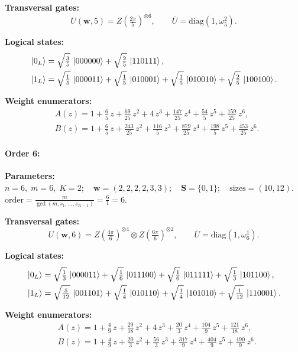 \documentclass[pdflatex,sn-nature]{sn-jnl}%
\theoremstyle{thmstyleone}%
\theoremstyle{thmstyletwo}%
\theoremstyle{thmstylethree}%
\begin{document}
\begin{appendices}
\noindent\textbf{Transversal gates:}
\[
    U(\mathbf w,5)=Z \left(\tfrac{2\pi}{5}\right)^{\otimes6} ,\qquad
    \overline U=\mathrm{diag}(1,\omega_{5}^{2}).
\]

\noindent\textbf{Logical states:}
\begin{align*}
    &\ket{0_L} = \sqrt{\tfrac{3}{5}}\,\ket{000000} + \sqrt{\tfrac{2}{5}}\,\ket{110111}, \\
    &\ket{1_L} = \sqrt{\tfrac{1}{5}}\,\ket{000011} + \sqrt{\tfrac{1}{5}}\,\ket{010001} + \sqrt{\tfrac{1}{5}}\,\ket{010010} + \sqrt{\tfrac{2}{5}}\,\ket{100100}.
\end{align*}

\noindent\textbf{Weight enumerators:}
\begin{align*}
    &A(z) = 1 + \tfrac{6}{5}\,z + \tfrac{69}{25}\,z^{2} + 4\,z^{3} + \tfrac{147}{25}\,z^{4} + \tfrac{54}{5}\,z^{5} + \tfrac{159}{25}\,z^{6}, \\
    &B(z) = 1 + \tfrac{6}{5}\,z + \tfrac{243}{25}\,z^{2} + \tfrac{116}{5}\,z^{3} + \tfrac{879}{25}\,z^{4} + \tfrac{198}{5}\,z^{5} + \tfrac{453}{25}\,z^{6}.
\end{align*}

\paragraph{\textbf{Order 6:}}
\noindent\textbf{Parameters:} $n=6,\; m=6,\; K=2;\quad \mathbf w=(2, 2, 2, 2, 3, 3);\quad \mathbf S=\{0, 1\};\quad \text{sizes}=\left(10, 12\right).$ $\displaystyle \text{order}=\frac{m}{\gcd(m,s_1,\dots,s_{K-1})}=\frac{6}{1}=6.$

\noindent\textbf{Transversal gates:}
\[
    U(\mathbf w,6)=Z \left(\tfrac{4\pi}{6}\right)^{\otimes4} \otimes Z \left(\tfrac{6\pi}{6}\right)^{\otimes2} ,\qquad
    \overline U=\mathrm{diag}(1,\omega_{6}^{1}).
\]

\noindent\textbf{Logical states:}
\begin{align*}
    &\ket{0_L} = \sqrt{\tfrac{1}{3}}\,\ket{000011} + \sqrt{\tfrac{1}{6}}\,\ket{011100} + \sqrt{\tfrac{1}{6}}\,\ket{011111} + \sqrt{\tfrac{1}{3}}\,\ket{101100}, \\
    &\ket{1_L} = \sqrt{\tfrac{5}{12}}\,\ket{001101} + \sqrt{\tfrac{1}{4}}\,\ket{010110} + \sqrt{\tfrac{1}{4}}\,\ket{101010} + \sqrt{\tfrac{1}{12}}\,\ket{110001}.
\end{align*}

\noindent\textbf{Weight enumerators:}
\begin{align*}
    &A(z) = 1 + \tfrac{4}{9}\,z + \tfrac{29}{18}\,z^{2} + 4\,z^{3} + \tfrac{20}{3}\,z^{4} + \tfrac{104}{9}\,z^{5} + \tfrac{121}{18}\,z^{6}, \\
    &B(z) = 1 + \tfrac{4}{9}\,z + \tfrac{20}{3}\,z^{2} + \tfrac{56}{3}\,z^{3} + \tfrac{317}{9}\,z^{4} + \tfrac{404}{9}\,z^{5} + \tfrac{190}{9}\,z^{6}.
\end{align*}



\end{appendices}
\end{document}
